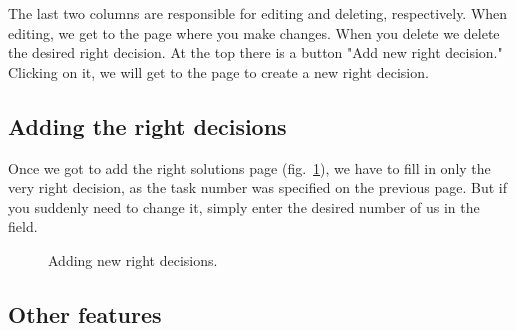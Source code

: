 \documentclass{acmtog} %
\begin{document}
The last two columns are responsible for editing and deleting, respectively. When editing, we get to the page where you make changes. When you delete we delete the desired right decision. At the top there is a button "Add new right decision." Clicking on it, we will get to the page to create a new right decision.

\subsection{Adding the right decisions}
Once we got to add the right solutions page (fig.~\ref{addcorrect}), we have to fill in only the very right decision, as the task number was specified on the previous page. But if you suddenly need to change it, simply enter the desired number of us in the field.
\begin{figure}[h]
\caption{Adding new right decisions.}
\label{addcorrect}
\end{figure}

\subsection{Other features}
\end{document}
